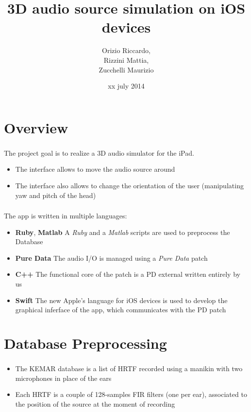 \documentclass{beamer}
\title{3D audio source simulation on iOS devices}
\author[Orizio, Rizzini, Zucchelli]{Orizio Riccardo,\\Rizzini Mattia,\\Zucchelli Maurizio}
\date{xx july 2014}
\institute[UniBS]{University of Brescia}
\begin{document}
	\begin{frame}
		\maketitle
	\end{frame}

	\section{Overview}
	
	\begin{frame}
		\frametitle{\insertsection}
		The project goal is to realize a 3D audio simulator for the iPad.
		\begin{itemize}
			\item The interface allows to move the audio source around
			\item The interface also allows to change the orientation of the user (manipulating yaw
				and pitch of the head)
		\end{itemize}
	\end{frame}

	\begin{frame}
		\frametitle{\insertsection}
		The app is written in multiple languages:
		\begin{itemize}
			\item {\bf Ruby}, {\bf Matlab} A {\em Ruby} and a {\em Matlab} scripts are used to 
				preprocess the Database
			\item {\bf Pure Data} The audio I/O is managed using a {\em Pure Data} patch
			\item {\bf C++} The functional core of the patch is a PD external written entirely
				by us
			\item {\bf Swift} The new Apple's language for iOS devices is used to develop the
				graphical inferface of the app, which communicates with the PD patch
		\end{itemize}
	\end{frame}

	\AtBeginSection[]
	{
		\begin{frame}
			\frametitle{Outline}
			\tableofcontents[currentsection]
		\end{frame}
	}

	\section{Database Preprocessing}

	\begin{frame}
		\frametitle{\insertsection}
		\begin{itemize}
			\item The KEMAR database is a list of HRTF recorded using a manikin with two
				microphones in place of the ears
			\item Each HRTF is a couple of 128-samples FIR filters (one per ear), associated to the position
				of the source at the moment of recording
		\end{itemize}
	\end{frame}
\end{document}
